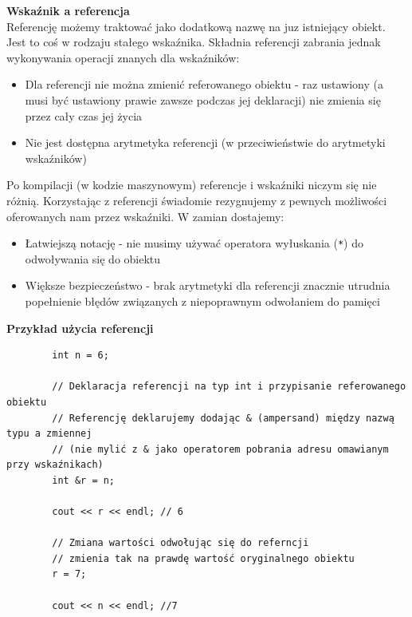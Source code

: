 \documentclass[12pt]{article}
\begin{document}
    \begin{definition}
        \textbf{Wskaźnik a referencja} \\
        Referencję możemy traktować jako dodatkową nazwę na juz istniejący obiekt. Jest to coś w rodzaju stałego wskaźnika.
        Składnia referencji zabrania jednak wykonywania operacji znanych dla wskaźników:
        \begin{itemize}
            \item Dla referencji nie można zmienić referowanego obiektu - raz ustawiony (a musi być ustawiony prawie zawsze podczas jej deklaracji) nie zmienia się przez cały czas jej życia
            \item Nie jest dostępna arytmetyka referencji (w przeciwieństwie do arytmetyki wskaźników)
        \end{itemize}
        Po kompilacji (w kodzie maszynowym) referencje i wskaźniki niczym się nie różnią.
        Korzystając z referencji świadomie rezygnujemy z pewnych możliwości oferowanych nam przez wskaźniki. W zamian dostajemy:
        \begin{itemize}
            \item Łatwiejszą notację - nie musimy używać operatora wyłuskania (\texttt{*}) do odwoływania się do obiektu
            \item Większe bezpieczeństwo - brak arytmetyki dla referencji znacznie utrudnia popełnienie błędów związanych z niepoprawnym odwołaniem do pamięci
        \end{itemize}
    \end{definition}

    \noindent \textbf{Przykład użycia referencji}
    \begin{verbatim}
        int n = 6;

        // Deklaracja referencji na typ int i przypisanie referowanego obiektu
        // Referencję deklarujemy dodając & (ampersand) między nazwą typu a zmiennej
        // (nie mylić z & jako operatorem pobrania adresu omawianym przy wskaźnikach)
        int &r = n;

        cout << r << endl; // 6

        // Zmiana wartości odwołując się do referncji
        // zmienia tak na prawdę wartość oryginalnego obiektu
        r = 7;

        cout << n << endl; //7
    \end{verbatim}

    \newpage
\end{document}

